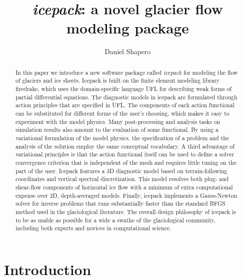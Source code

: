 \documentclass{article}
\title{\emph{icepack}: a novel glacier flow modeling package}
\author{Daniel Shapero}
\date{}
\theoremstyle{definition}
\theoremstyle{plain}
\begin{document}
\tableofcontents
\newpage

\maketitle

\begin{abstract}
In this paper we introduce a new software package called \emph{icepack} for modeling the flow of glaciers and ice sheets.
Icepack is built on the finite element modeling library firedrake, which uses the domain-specific language UFL for describing weak forms of partial differential equations.
The diagnostic models in icepack are formulated through action principles that are specified in UFL.
The components of each action functional can be substituted for different forms of the user's choosing, which makes it easy to experiment with the model physics.
Many post-processing and analysis tasks on simulation results also amount to the evaluation of some functional.
By using a variational formulation of the model physics, the specification of a problem and the analysis of the solution employ the same conceptual vocabulary.
A third advantage of variational principles is that the action functional itself can be used to define a solver convergence criterion that is independent of the mesh and requires little tuning on the part of the user.
Icepack features a 3D diagnostic model based on terrain-following coordinates and vertical spectral discretization.
This model resolves both plug- and shear-flow components of horizontal ice flow with a minimum of extra computational expense over 2D, depth-averaged models.
Finally, icepack implements a Gauss-Newton solver for inverse problems that runs substantially faster than the standard BFGS method used in the glaciological literature.
The overall design philosophy of icepack is to be as usable as possible for a wide a swathe of the glaciological community, including both experts and novices in computational science.
\end{abstract}

\section{Introduction}
\end{document}
